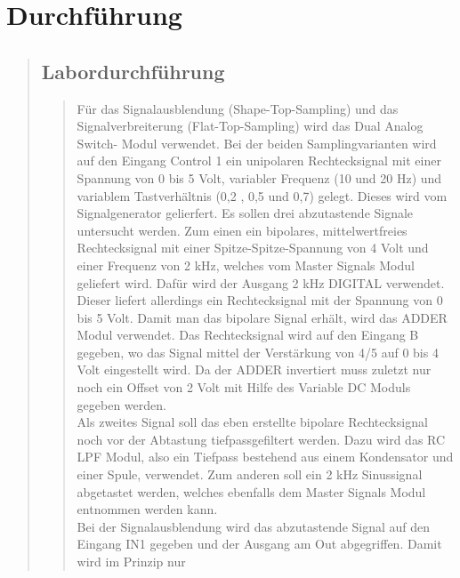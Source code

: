 

\section{Durchführung}
\begin{quote}
    
    
    \subsection{Labordurchführung}
    \begin{quote}
     Für das Signalausblendung (Shape-Top-Sampling) und das
     Signalverbreiterung (Flat-Top-Sampling) wird das Dual Analog Switch- Modul
     verwendet.
     Bei der beiden Samplingvarianten wird auf den Eingang Control 1 ein
     unipolaren Rechtecksignal mit einer Spannung von 0 bis 5 Volt, variabler
     Frequenz (10 und 20 Hz) und variablem Tastverhältnis (0,2 , 0,5 und 0,7)
     gelegt. Dieses wird vom Signalgenerator gelierfert.
     Es sollen drei abzutastende Signale untersucht werden. Zum einen ein
     bipolares, mittelwertfreies Rechtecksignal mit einer Spitze-Spitze-Spannung von 4 Volt und einer
     Frequenz von 2 kHz, welches vom Master Signals Modul geliefert wird. Dafür
     wird der Ausgang 2 kHz DIGITAL verwendet. Dieser liefert allerdings ein
     Rechtecksignal mit der Spannung von 0 bis 5 Volt. Damit man das
     bipolare Signal erhält, wird das ADDER Modul verwendet. Das Rechtecksignal
     wird auf den Eingang B gegeben, wo das Signal mittel der Verstärkung von
     4/5 auf 0 bis 4 Volt eingestellt wird. Da der ADDER invertiert muss zuletzt
     nur noch ein Offset von 2 Volt mit Hilfe des Variable DC Moduls gegeben
     werden.\\
     \noindent\hspace*{4mm}%
     Als zweites Signal soll das eben erstellte bipolare Rechtecksignal noch vor
     der Abtastung tiefpassgefiltert werden. Dazu wird das RC LPF Modul, also
     ein Tiefpass bestehend aus einem Kondensator und einer Spule, verwendet.
     Zum anderen soll ein 2 kHz Sinussignal abgetastet werden, welches ebenfalls
     dem Master Signals Modul entnommen werden kann.\\
     \noindent\hspace*{4mm}%
     Bei der Signalausblendung wird das abzutastende Signal auf den Eingang
     IN1 gegeben und der Ausgang am Out abgegriffen. Damit wird im Prinzip nur

\end{quote}
\end{quote}
